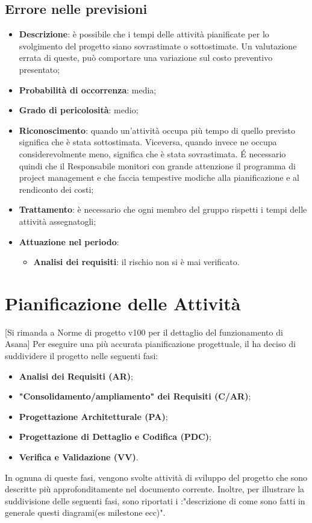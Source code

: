 		\subsection{Errore nelle previsioni}
		\begin{itemize}
			\item \textbf{Descrizione}: è possibile che i tempi delle attività pianificate per lo svolgimento del progetto siano sovrastimate o sottostimate. Un valutazione errata di queste, può comportare una variazione sul costo preventivo presentato; 
			\item \textbf{Probabilità di occorrenza}: media;
			\item \textbf{Grado di pericolosità}: medio;
			\item \textbf{Riconoscimento}: quando un'attività occupa più tempo di quello previsto significa che è stata sottostimata. Viceversa, quando invece ne occupa considerevolmente meno, significa che è stata sovrastimata. É necessario quindi che il 						Responsabile monitori con grande attenzione il programma di project management e che faccia tempestive modiche alla pianificazione e al rendiconto dei costi; 
			\item \textbf{Trattamento}: è necessario che ogni membro del gruppo rispetti i tempi delle attività assegnatogli; 
			\item \textbf{Attuazione nel periodo}:
			\begin{itemize}
				\item \textbf{Analisi dei requisiti}:  il rischio non si è mai verificato.
			\end{itemize}
		\end{itemize}
\section{Pianificazione delle Attività}
[Si rimanda a Norme di progetto v100 per il dettaglio del funzionamento di Asana]
Per eseguire una più accurata pianificazione progettuale, il  ha deciso di suddividere il progetto nelle seguenti fasi:
\begin{itemize}
	\item \textbf{Analisi dei Requisiti (AR)};
	\item \textbf{"Consolidamento/ampliamento" dei Requisiti (C/AR)};
	\item \textbf{Progettazione Architetturale (PA)};
	\item \textbf{Progettazione di Dettaglio e Codifica (PDC)};
	\item \textbf{Verifica e Validazione (VV)}.
\end{itemize}
In ognuna di queste fasi, vengono svolte attività di sviluppo del progetto che sono descritte più approfonditamente nel documento corrente.
Inoltre, per illustrare la suddivisione delle seguenti fasi, sono riportati i :"descrizione di come sono fatti in generale 
questi diagrami(es milestone ecc)".

